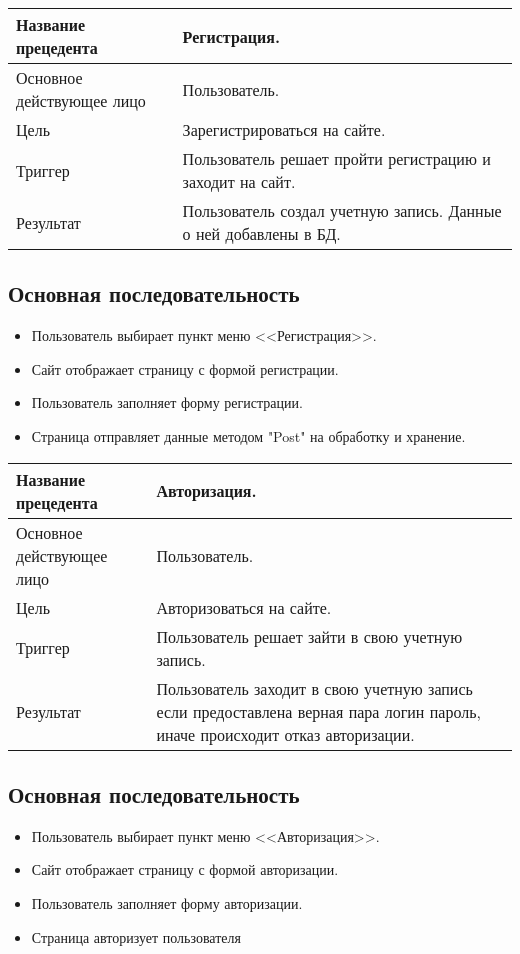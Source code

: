 \begin{center}
    \begin{tabularx}{\textwidth}{|X|X|} \hline
    Название прецедента       & Регистрация.\\ \hline
    Основное действующее лицо & Пользователь.\\ \hline
    Цель                      & Зарегистрироваться на сайте.\\ \hline
    Триггер                   & Пользователь решает пройти регистрацию и заходит на сайт.\\ \hline
    Результат                 & Пользователь создал учетную запись. Данные о ней добавлены в БД.\\ \hline
    \end{tabularx}
\end{center}

\subsection{Основная последовательность}
\begin{itemize}
    \item Пользователь выбирает пункт меню <<Регистрация>>.
    \item Сайт отображает страницу с формой регистрации.
    \item Пользователь заполняет форму регистрации.
    \item Страница отправляет данные методом "Post" на обработку и хранение. 
\end{itemize}

\begin{center}
    \begin{tabularx}{\textwidth}{|X|X|} \hline
    Название прецедента       & Авторизация.\\ \hline
    Основное действующее лицо & Пользователь.\\ \hline
    Цель                      & Авторизоваться на сайте.\\ \hline
    Триггер                   & Пользователь решает зайти в свою учетную запись.\\ \hline
    Результат                 & Пользователь заходит в свою учетную запись если предоставлена верная пара логин пароль, иначе происходит отказ авторизации. \\ \hline
    \end{tabularx}
\end{center}

\subsection{Основная последовательность}
\begin{itemize}
    \item Пользователь выбирает пункт меню <<Авторизация>>.
    \item Сайт отображает страницу с формой авторизации.
    \item Пользователь заполняет форму авторизации.
    \item Страница авторизует пользователя
\end{itemize}
